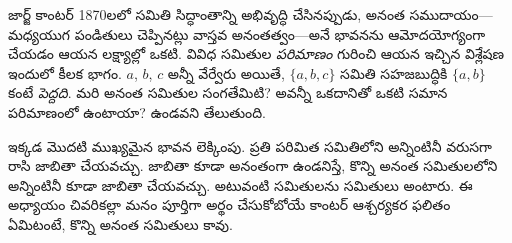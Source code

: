 \documentclass[../../../include/open-logic-section]{subfiles}
\begin{document}


జార్జ్ కాంటర్ 1870లలో సమితి సిద్ధాంతాన్ని అభివృద్ధి చేసినప్పుడు,
అనంత సముదాయం---మధ్యయుగ పండితులు చెప్పినట్లు వాస్తవ అనంతత్వం---అనే
భావనను ఆమోదయోగ్యంగా చేయడం ఆయన లక్ష్యాల్లో ఒకటి. వివిధ సమితుల
\emph{పరిమాణం} గురించి ఆయన ఇచ్చిన విశ్లేషణ ఇందులో కీలక భాగం.
$a$, $b$, $c$ అన్నీ వేర్వేరు అయితే, $\{a, b, c\}$ సమితి సహజబుద్ధికి
$\{a, b\}$ కంటే \emph{పెద్దది}. మరి అనంత సమితుల సంగతేమిటి?
అవన్నీ ఒకదానితో ఒకటి సమాన పరిమాణంలో ఉంటాయా? ఉండవని తేలుతుంది.

ఇక్కడ మొదటి ముఖ్యమైన భావన లెక్కింపు. ప్రతి పరిమిత సమితిలోని
 అన్నింటినీ వరుసగా రాసి జాబితా చేయవచ్చు. జాబితా కూడా
అనంతంగా ఉండనిస్తే, కొన్ని అనంత సమితులలోని  అన్నింటినీ
కూడా జాబితా చేయవచ్చు. అటువంటి సమితులను  సమితులు అంటారు.
ఈ అధ్యాయం చివరికల్లా మనం పూర్తిగా అర్థం చేసుకోబోయే కాంటర్ ఆశ్చర్యకర
ఫలితం ఏమిటంటే, కొన్ని అనంత సమితులు  కావు.
\end{document}
